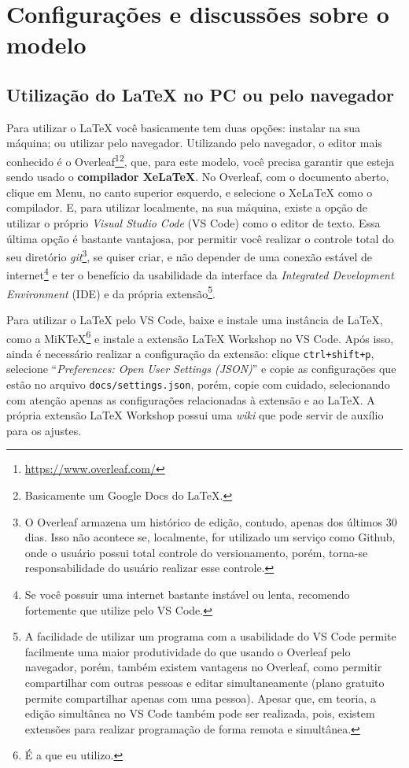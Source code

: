 \chapter{Configurações e discussões sobre o modelo}\label{capitulo:configuracao}
\section{Utilização do \LaTeX{} no PC ou pelo navegador}
Para utilizar o \LaTeX{} você basicamente tem duas opções: instalar na sua máquina; ou utilizar pelo navegador. Utilizando pelo navegador, o editor mais conhecido é o Overleaf\footnote{\url{https://www.overleaf.com/}}\footnote{Basicamente um Google Docs do \LaTeX{}.}, que, para este modelo, você precisa garantir que esteja sendo usado o \textbf{compilador XeLaTeX}. No Overleaf, com o documento aberto, clique em Menu, no canto superior esquerdo, e selecione o XeLaTeX como o compilador. E, para utilizar localmente, na sua máquina, existe a opção de utilizar o próprio \textit{Visual Studio Code} (VS Code) como o editor de texto. Essa última opção é bastante vantajosa, por permitir você realizar o controle total do seu diretório \textit{git}\footnote{O Overleaf armazena um histórico de edição, contudo, apenas dos últimos 30 dias. Isso não acontece se, localmente, for utilizado um serviço como Github, onde o usuário possui total controle do versionamento, porém, torna-se responsabilidade do usuário realizar esse controle.}, se quiser criar, e não depender de uma conexão estável de internet\footnote{Se você possuir uma internet bastante instável ou lenta, recomendo fortemente que utilize pelo VS Code.} e ter o benefício da usabilidade da interface da \textit{Integrated Development Environment} (IDE) e da própria extensão\footnote{A facilidade de utilizar um programa com a usabilidade do VS Code permite facilmente uma maior produtividade do que usando o Overleaf pelo navegador, porém, também existem vantagens no Overleaf, como permitir compartilhar com outras pessoas e editar simultaneamente (plano gratuito permite compartilhar apenas com uma pessoa). Apesar que, em teoria, a edição simultânea no VS Code também pode ser realizada, pois, existem extensões para realizar programação de forma remota e simultânea.}.

Para utilizar o \LaTeX{} pelo VS Code, baixe e instale uma instância de \LaTeX{}, como a MiKTeX\footnote{É a que eu utilizo.} e instale a extensão LaTeX Workshop no VS Code. Após isso, ainda é necessário realizar a configuração da extensão: clique \texttt{ctrl+shift+p}, selecione ``\textit{Preferences: Open User Settings (JSON)}'' e copie as configurações que estão no arquivo \texttt{docs/settings.json}, porém, copie com cuidado, selecionando com atenção apenas as configurações relacionadas à extensão e ao \LaTeX{}. A própria extensão LaTeX Workshop possui uma \textit{wiki} que pode servir de auxílio para os ajustes.

